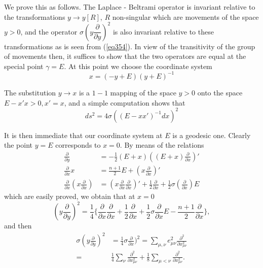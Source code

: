 We prove this as follows. The Laplace - Beltrami operator is invariant
relative to the transformations $y \rightarrow y[R]$, $R$
non-singular which are movements of the space $y > 0$, and the
operator $\sigma (y \dfrac{\partial}{\partial y})^2$ is also invariant
relative to these transformations as is seen from (\ref{eq354}). In view of the
transitivity of the group of movements then, it suffices to show that
the two operators are equal at the special point $\gamma = E$. At this
point we choose the coordinate system 
\begin{equation*}
x = (- y + E)(y + E)^{-1} \tag{364}\label{eq364}
\end{equation*}

The substitution $y \rightarrow x$ is a $1-1$ mapping of the space $y >
0$ onto the space $E - x'x > 0, x' = x$, and a simple computation
shows that 
\begin{equation*}
ds^2 = 4 \sigma ((E - x x')^{-1} dx )^2 \tag{365}\label{eq365}
\end{equation*}\pageoriginale

It is then immediate that our coordinate system at $E$ is a geodesic
one.  Clearly the point $y = E$ corresponds to $x = 0$. By means of
the relations  
\begin{align*}
\frac{\partial}{\partial y} & = - \frac{1}{2}(E + x) ((E + x)
\frac{\partial}{\partial x})' \tag{366}\label{eq366} \\ 
\frac{\partial}{\partial x}x & = \frac{n+1}{2} E + (x
\frac{\partial}{\partial x})' \\ 
\frac{\partial}{\partial x}(x \frac{\partial}{\partial x}) & = (x
\frac{\partial}{\partial x} \frac{\partial}{\partial x})' +
\frac{1}{2} \frac{\partial}{\partial x} + \frac{1}{2}
\sigma(\frac{\partial}{\partial x})E 
\end{align*}
which are easily proved, we obtain that at $x = 0$
$$
(y \frac{\partial}{\partial y})^2 = \frac{1}{4}\bigg\{ 
\frac{\partial}{\partial x} \frac{\partial}{\partial x} + \frac{1}{2} 
\frac{\partial}{\partial x} + \frac{1}{2} \sigma
\frac{\partial}{\partial x} E - \frac{n+1}{2} \frac{\partial}{\partial
  x} \bigg\}, 
$$
and then 
\begin{align*}
\sigma(y \frac{\partial}{\partial y})^2 & = \frac{1}{4}
\sigma{\frac{\partial}{\partial x}})^2 = \sum_{\mu, \nu} e^{2}_{\mu
  \nu} \frac{\partial^2}{\partial x^2_{\mu \nu}} \\ 
= & \frac{1}{4} \sum_{\nu} \frac{\partial^2}{\partial x^2_{\mu \nu}} +
\frac{1}{8} \sum_{\mu < \nu} \frac{\partial^2}{\partial x^2_{\mu
    \nu}}. 
\end{align*}

